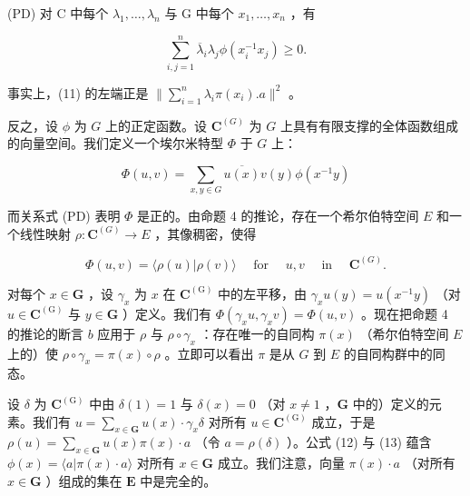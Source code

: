 (PD) 对 C 中每个 \(\lambda_{1},\ldots,\lambda_{n}\) 与 G 中每个 \(x_{1},\ldots,x_{n}\) ，有

\[
\sum_ {i, j = 1} ^ {n} \overline {{\lambda}} _ {i} \lambda_ {j} \phi (x _ {i} ^ {- 1} x _ {j}) \geqslant 0.\tag{11}
\]

事实上，(11) 的左端正是 \(\| \sum_{i=1}^{n} \lambda_i \pi(x_i). a \|^2\) 。

反之，设 \(\phi\) 为 \(G\) 上的正定函数。设 \(\mathbf{C}^{(G)}\) 为 \(G\) 上具有有限支撑的全体函数组成的向量空间。我们定义一个埃尔米特型 \(\Phi\) 于 \(G\) 上：

\[
\Phi (u, v) = \sum_ {x, y \in G} \overline {{u (x)}} v (y) \phi (x ^ {- 1} y)\tag{12}
\]

而关系式 (PD) 表明 \(\Phi\) 是正的。由命题 4 的推论，存在一个希尔伯特空间 \(E\) 和一个线性映射 \(\rho : \mathbf{C}^{(G)} \to E\) ，其像稠密，使得

\[
\Phi (u, v) = \langle \rho (u) | \rho (v) \rangle \quad \text { for } \quad u, v \quad \text { in } \quad \mathbf {C} ^ {(G)}.\tag{13}
\]

对每个 \(x \in \mathbf{G}\) ，设 \(\gamma_x\) 为 \(x\) 在 \(\mathbf{C}^{(\mathrm{G})}\) 中的左平移，由 \(\gamma_x u(y) = u(x^{-1}y)\) （对 \(u \in \mathbf{C}^{(\mathrm{G})}\) 与 \(y \in \mathbf{G}\) ）定义。我们有 \(\Phi(\gamma_x u, \gamma_x v) = \Phi(u, v)\) 。现在把命题 4 的推论的断言 \(b\) 应用于 \(\rho\) 与 \(\rho \circ \gamma_x\) ：存在唯一的自同构 \(\pi(x)\) （希尔伯特空间 \(E\) 上的）使 \(\rho \circ \gamma_x = \pi(x) \circ \rho\) 。立即可以看出 \(\pi\) 是从 \(G\) 到 \(E\) 的自同构群中的同态。

设 \(\delta\) 为 \(\mathbf{C}^{(\mathrm{G})}\) 中由 \(\delta(1) = 1\) 与 \(\delta(x) = 0\) （对 \(x \neq 1\) ，\(\mathbf{G}\) 中的）定义的元素。我们有 \(u = \sum_{x \in \mathbf{G}} u(x) \cdot \gamma_x \delta\) 对所有 \(u \in \mathbf{C}^{(\mathrm{G})}\) 成立，于是 \(\rho(u) = \sum_{x \in \mathbf{G}} u(x) \pi(x) \cdot a\) （令 \(a = \rho(\delta)\) ）。公式 (12) 与 (13) 蕴含 \(\phi(x) = \langle a | \pi(x) \cdot a \rangle\) 对所有 \(x \in \mathbf{G}\) 成立。我们注意，向量 \(\pi(x) \cdot a\) （对所有 \(x \in \mathbf{G}\) ）组成的集在 \(\mathbf{E}\) 中是完全的。

